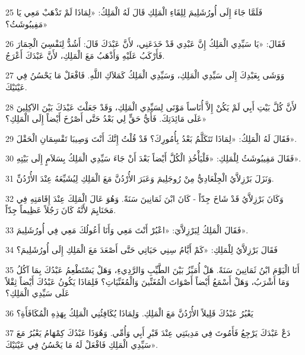 \par 25 فَلَمَّا جَاءَ إِلَى أُورُشَلِيمَ لِلِقَاءِ الْمَلِكِ قَالَ لَهُ الْمَلِكُ: «لِمَاذَا لَمْ تَذْهَبْ مَعِي يَا مَفِيبُوشَثُ؟»
\par 26 فَقَالَ: «يَا سَيِّدِي الْمَلِكُ إِنَّ عَبْدِي قَدْ خَدَعَنِي، لأَنَّ عَبْدَكَ قَالَ: أَشُدُّ لِنَفْسِيَ الْحِمَارَ فَأَرْكَبُ عَلَيْهِ وَأَذْهَبُ مَعَ الْمَلِكِ، لأَنَّ عَبْدَكَ أَعْرَجُ.
\par 27 وَوَشَى بِعَبْدِكَ إِلَى سَيِّدِي الْمَلِكِ، وَسَيِّدِي الْمَلِكُ كَمَلاَكِ اللَّهِ. فَافْعَلْ مَا يَحْسُنُ فِي عَيْنَيْكَ.
\par 28 لأَنَّ كُلَّ بَيْتِ أَبِي لَمْ يَكُنْ إِلاَّ أُنَاساً مَوْتَى لِسَيِّدِي الْمَلِكِ، وَقَدْ جَعَلْتَ عَبْدَكَ بَيْنَ الآكِلِينَ عَلَى مَائِدَتِكَ. فَأَيُّ حَقٍّ لِي بَعْدُ حَتَّى أَصْرُخَ أَيْضاً إِلَى الْمَلِكِ؟»
\par 29 فَقَالَ لَهُ الْمَلِكُ: «لِمَاذَا تَتَكَلَّمُ بَعْدُ بِأُمُورِكَ؟ قَدْ قُلْتُ إِنَّكَ أَنْتَ وَصِيبَا تَقْسِمَانِ الْحَقْلَ».
\par 30 فَقَالَ مَفِيبُوشَثُ لِلْمَلِكِ: «فَلْيَأْخُذِ الْكُلَّ أَيْضاً بَعْدَ أَنْ جَاءَ سَيِّدِي الْمَلِكُ بِسَلاَمٍ إِلَى بَيْتِهِ».
\par 31 وَنَزَلَ بَرْزِلاَّيُ الْجِلْعَادِيُّ مِنْ رُوجَلِيمَ وَعَبَرَ الأُرْدُنَّ مَعَ الْمَلِكِ لِيُشَيِّعَهُ عِنْدَ الأُرْدُنِّ.
\par 32 وَكَانَ بَرْزِلاَّيُ قَدْ شَاخَ جِدّاً - كَانَ ابْنَ ثَمَانِينَ سَنَةً. وَهُوَ عَالَ الْمَلِكَ عِنْدَ إِقَامَتِهِ فِي مَحَنَايِمَ لأَنَّهُ كَانَ رَجُلاً عَظِيماً جِدّاً.
\par 33 فَقَالَ الْمَلِكُ لِبَرْزِلاَّيَ: «اعْبُرْ أَنْتَ مَعِي وَأَنَا أَعُولُكَ مَعِي فِي أُورُشَلِيمَ».
\par 34 فَقَالَ بَرْزِلاَّيُ لِلْمَلِكِ: «كَمْ أَيَّامُ سِنِي حَيَاتِي حَتَّى أَصْعَدَ مَعَ الْمَلِكِ إِلَى أُورُشَلِيمَ؟
\par 35 أَنَا الْيَوْمَ ابْنُ ثَمَانِينَ سَنَةً. هَلْ أُمَيِّزُ بَيْنَ الطَّيِّبِ وَالرَّدِيءِ، وَهَلْ يَسْتَطْعِمُ عَبْدُكَ بِمَا آكُلُ وَمَا أَشْرَبُ، وَهَلْ أَسْمَعُ أَيْضاً أَصْوَاتَ الْمُغَنِّينَ وَالْمُغَنِّيَاتِ؟ فَلِمَاذَا يَكُونُ عَبْدُكَ أَيْضاً ثِقْلاً عَلَى سَيِّدِي الْمَلِكِ؟
\par 36 يَعْبُرُ عَبْدُكَ قَلِيلاً الأُرْدُنَّ مَعَ الْمَلِكِ. وَلِمَاذَا يُكَافِئُنِي الْمَلِكُ بِهَذِهِ الْمُكَافَأَةِ؟
\par 37 دَعْ عَبْدَكَ يَرْجِعُ فَأَمُوتَ فِي مَدِينَتِي عِنْدَ قَبْرِ أَبِي وَأُمِّي. وَهُوَذَا عَبْدُكَ كِمْهَامُ يَعْبُرُ مَعَ سَيِّدِي الْمَلِكِ فَافْعَلْ لَهُ مَا يَحْسُنُ فِي عَيْنَيْكَ».
